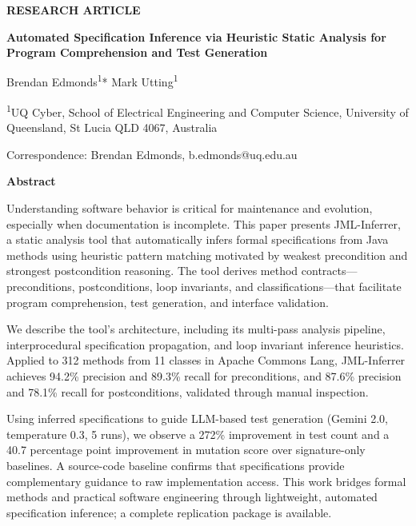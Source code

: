 \documentclass[11pt]{article}
\begin{document}
\linenumbers

\noindent\textbf{RESEARCH ARTICLE}
\vspace{1em}

\begin{center}
{\LARGE\bfseries Automated Specification Inference via Heuristic Static Analysis for Program Comprehension and Test Generation}
\vspace{1.5em}

{\large Brendan Edmonds\textsuperscript{1}* \quad Mark Utting\textsuperscript{1}}
\vspace{0.5em}

{\small\textsuperscript{1}UQ Cyber, School of Electrical Engineering and Computer Science, University of Queensland, St Lucia QLD 4067, Australia}
\vspace{0.5em}

{\small *Correspondence: Brendan Edmonds, b.edmonds@uq.edu.au}
\end{center}

\vspace{1em}

\noindent\textbf{Abstract}
\vspace{0.5em}

\noindent Understanding software behavior is critical for maintenance and evolution, especially when documentation is incomplete. This paper presents JML-Inferrer, a static analysis tool that automatically infers formal specifications from Java methods using heuristic pattern matching motivated by weakest precondition and strongest postcondition reasoning. The tool derives method contracts---preconditions, postconditions, loop invariants, and classifications---that facilitate program comprehension, test generation, and interface validation.

We describe the tool's architecture, including its multi-pass analysis pipeline, interprocedural specification propagation, and loop invariant inference heuristics. Applied to 312 methods from 11 classes in Apache Commons Lang, JML-Inferrer achieves 94.2\% precision and 89.3\% recall for preconditions, and 87.6\% precision and 78.1\% recall for postconditions, validated through manual inspection.

Using inferred specifications to guide LLM-based test generation (Gemini 2.0, temperature 0.3, 5 runs), we observe a 272\% improvement in test count and a 40.7 percentage point improvement in mutation score over signature-only baselines. A source-code baseline confirms that specifications provide complementary guidance to raw implementation access. This work bridges formal methods and practical software engineering through lightweight, automated specification inference; a complete replication package is available.
\end{document}
